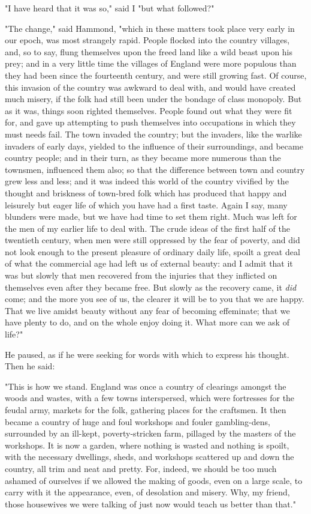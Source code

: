 "I have heard that it was so," said I "but what followed?"

"The change," said Hammond, "which in these matters took place very
early in our epoch, was most strangely rapid. People flocked into the
country villages, and, so to say, flung themselves upon the freed land
like a wild beast upon his prey; and in a very little time the villages
of England were more populous than they had been since the fourteenth
century, and were still growing fast. Of course, this invasion of the
country was awkward to deal with, and would have created much misery, if
the folk had still been under the bondage of class monopoly. But as it
was, things soon righted themselves. People found out what they were fit
for, and gave up attempting to push themselves into occupations in which
they must needs fail. The town invaded the country; but the invaders,
like the warlike invaders of early days, yielded to the influence of
their surroundings, and became country people; and in their turn, as
they became more numerous than the townsmen, influenced them also; so
that the difference between town and country grew less and less; and it
was indeed this world of the country vivified by the thought and
briskness of town-bred folk which has produced that happy and leisurely
but eager life of which you have had a first taste. Again I say, many
blunders were made, but we have had time to set them right. Much was
left for the men of my earlier life to deal with. The crude ideas of the
first half of the twentieth century, when men were still oppressed by
the fear of poverty, and did not look enough to the present pleasure of
ordinary daily life, spoilt a great deal of what the commercial age had
left us of external beauty: and I admit that it was but slowly that men
recovered from the injuries that they inflicted on themselves even after
they became free. But slowly as the recovery came, it \emph{did} come;
and the more you see of us, the clearer it will be to you that we are
happy. That we live amidst beauty without any fear of becoming
effeminate; that we have plenty to do, and on the whole enjoy doing it.
What more can we ask of life?"

He paused, as if he were seeking for words with which to express his
thought. Then he said:

"This is how we stand. England was once a country of clearings amongst
the woods and wastes, with a few towns interspersed, which were
fortresses for the feudal army, markets for the folk, gathering places
for the craftsmen. It then became a country of huge and foul workshops
and fouler gambling-dens, surrounded by an ill-kept, poverty-stricken
farm, pillaged by the masters of the workshops. It is now a garden,
where nothing is wasted and nothing is spoilt, with the necessary
dwellings, sheds, and workshops scattered up and down the country, all
trim and neat and pretty. For, indeed, we should be too much ashamed of
ourselves if we allowed the making of goods, even on a large scale, to
carry with it the appearance, even, of desolation and misery. Why, my
friend, those housewives we were talking of just now would teach us
better than that."

